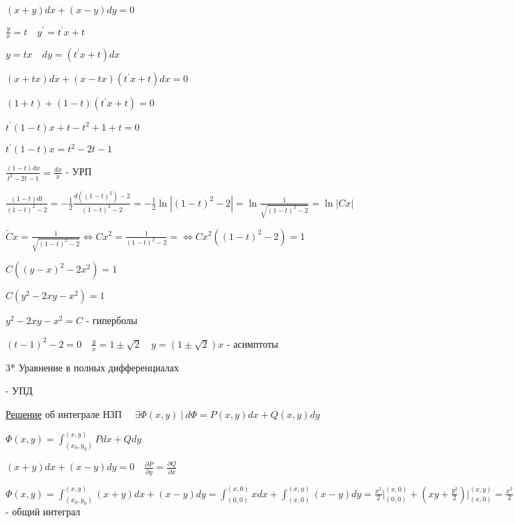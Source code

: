 \documentclass[12pt]{article}
\begin{document}
    \Ex $(x + y)dx + (x - y)dy = 0$

    $\displaystyle \frac{y}{x} = t \quad y^\prime = t^\prime x + t$

    $\displaystyle y = tx \quad dy = (t^\prime x + t)dx$

    $\displaystyle (x + tx)dx + (x - tx)(t^\prime x + t)dx = 0$

    $\displaystyle (1 + t) + (1 - t)(t^\prime x + t) = 0$

    $\displaystyle t^\prime (1 - t) x + t - t^2 + 1 + t = 0$

    $\displaystyle t^\prime (1 - t) x = t^2 - 2t - 1$

    $\displaystyle \frac{(1 - t) dx}{t^2 - 2t - 1} = \frac{dx}{x}$ - УРП

    $\displaystyle \frac{(1 - t)dt}{(1 - t)^2 - 2} = -\frac{1}{2}\frac{d((1 - t)^2) - 2}{(1 - t)^2 - 2} = -\frac{1}{2}\ln|(1 - t)^2 - 2| = \ln\frac{1}{\sqrt{(1 - t)^2 - 2}} = \ln|Cx|$

    $\displaystyle \tilde{C}x = \frac{1}{\sqrt{(1 - t)^2 - 2}} \Longleftrightarrow Cx^2 = \frac{1}{(1 - t)^2 - 2} = \Longleftrightarrow Cx^2 ((1 - t)^2 - 2) = 1$

    $\displaystyle C ((y - x)^2 - 2x^2) = 1$

    $\displaystyle C (y^2 - 2xy - x^2) = 1$

    $\displaystyle y^2 - 2xy - x^2 = C$ - гиперболы

    $\displaystyle (t - 1)^2 - 2 = 0 \quad \frac{y}{x} = 1 \pm \sqrt{2} \quad y = (1 \pm \sqrt{2})x$ - асимптоты

    3* Уравнение в полных дифференциалах

    \Def {} - УПД

    \vspace{5mm}

    \underline{Решение} \Mems \Ths об интеграле НЗП $\quad \exists \Phi(x, y)\ | \ d\Phi = P(x, y)dx + Q(x, y)dy$

    $\displaystyle \Phi(x, y) = \int^{(x,y)}_{(x_0,y_0)} Pdx + Qdy$

    \Ex $\displaystyle (x + y)dx + (x - y)dy = 0 \quad \frac{\partial P}{\partial y} = \frac{\partial Q}{\partial x}$

    $\displaystyle \Phi(x, y) = \int^{(x, y)}_{(x_0,y_0)} (x + y)dx + (x - y)dy =
    \int^{(x,0)}_{(0,0)} xdx + \int^{(x,y)}_{(x,0)} (x - y)dy = \frac{x^2}{2} \Big|_{(0, 0)}^{(x, 0)} +
    (xy + \frac{y^2}{2}) \Big|_{(x, 0)}^{(x, y)} = \frac{x^2}{2} + xy - \frac{y^2}{2} + C$ - общий интеграл
\end{document}
